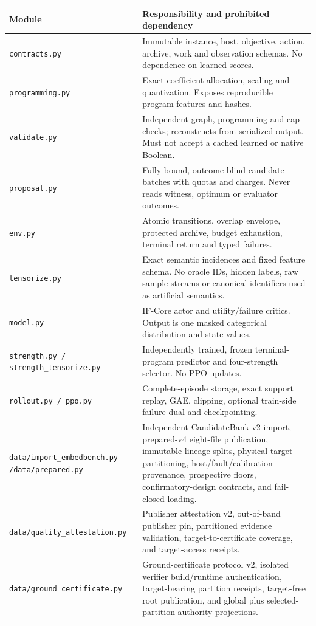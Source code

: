\documentclass[11pt,a4paper]{article}
\newcommand{\code}[1]{\texttt{\small #1}}
\theoremstyle{definition}\newtheorem{definition}[proposition]{Definition}
\begin{document}
{\small\begin{longtable}{@{}P{.30\textwidth}P{.63\textwidth}@{}}
\toprule
Module & Responsibility and prohibited dependency\\\midrule\endhead
\code{contracts.py} & Immutable instance, host, objective, action, archive, work and observation schemas. No dependence on learned scores.\\
\code{programming.py} & Exact coefficient allocation, scaling and quantization. Exposes reproducible program features and hashes.\\
\code{validate.py} & Independent graph, programming and cap checks; reconstructs from serialized output. Must not accept a cached learned or native Boolean.\\
\code{proposal.py} & Fully bound, outcome-blind candidate batches with quotas and charges. Never reads witness, optimum or evaluator outcomes.\\
\code{env.py} & Atomic transitions, overlap envelope, protected archive, budget exhaustion, terminal return and typed failures.\\
\code{tensorize.py} & Exact semantic incidences and fixed feature schema. No oracle IDs, hidden labels, raw sample streams or canonical identifiers used as artificial semantics.\\
\code{model.py} & IF-Core actor and utility/failure critics. Output is one masked categorical distribution and state values.\\
\code{strength.py / strength\_tensorize.py} & Independently trained, frozen terminal-program predictor and four-strength selector. No PPO updates.\\
\code{rollout.py / ppo.py} & Complete-episode storage, exact support replay, GAE, clipping, optional train-side failure dual and checkpointing.\\
\code{data/import\_embedbench.py /}\newline\code{data/prepared.py} & Independent CandidateBank-v2 import, prepared-v4 eight-file publication, immutable lineage splits, physical target partitioning, host/fault/calibration provenance, prospective floors, confirmatory-design contracts, and fail-closed loading.\\
\code{data/quality\_attestation.py} & Publisher attestation v2, out-of-band publisher pin, partitioned evidence validation, target-to-certificate coverage, and target-access receipts.\\
\code{data/ground\_certificate.py} & Ground-certificate protocol v2, isolated verifier build/runtime authentication, target-bearing partition receipts, target-free root publication, and global plus selected-partition authority projections.\\

\end{longtable}}
\end{document}

